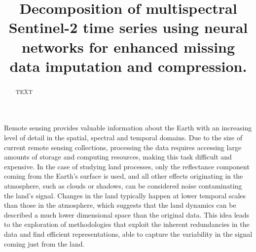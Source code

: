 \documentclass[essd, manuscript]{copernicus}
\begin{document}
\title{Decomposition of multispectral Sentinel-2 time series using neural networks for enhanced missing data imputation and compression.}











\received{}
\pubdiscuss{} %
\revised{}
\accepted{}
\published{}



\maketitle

\begin{abstract}
TEXT
\end{abstract}


\introduction  %

Remote sensing provides valuable information about the Earth with an increasing level of detail in the spatial, spectral and temporal domains. Due to the size of current remote sensing collections, processing the data requires accessing large amounts of storage and computing resources, making this task difficult and expensive. In the case of studying land processes, only the reflectance component coming from the Earth's surface is used, and all other effects originating in the atmosphere, such as clouds or shadows, can be considered noise contaminating the land's signal. Changes in the land typically happen at lower temporal scales than those in the atmosphere, which suggests that the land dynamics can be described a much lower dimensional space than the original data. This idea leads to the exploration of methodologies that exploit the inherent redundancies in the data and find efficient representations, able to capture the variability in the signal coming just from the land.
\end{document}
